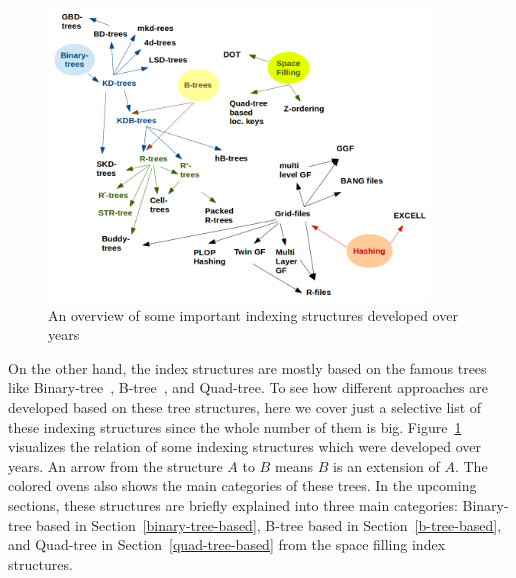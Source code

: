 \documentclass[a4paper,12pt]{article}
\begin{document}
\begin{figure}
\centering
\includegraphics[width=0.9\textwidth]{Trees}
\caption{An overview of some important indexing structures developed over years}
\label{trees}
\end{figure}

On the other hand, the index structures are mostly based on the famous trees like Binary-tree~\cite{binarytree}, B-tree~\cite{btree}, and Quad-tree. 
To see how different approaches are developed based on these tree structures, here we cover just a selective list of these indexing structures since the whole number of them
is big. Figure~\ref{trees} visualizes the relation of some indexing structures which were developed over years. An arrow from the structure $A$ to $B$ means $B$ is an extension of $A$. The colored ovens also shows the main categories of these
trees. In the upcoming sections, these structures are briefly explained into three main categories:
Binary-tree based in Section~\ref{binary-tree-based}, 
B-tree based in Section~\ref{b-tree-based}, 
and Quad-tree in Section~\ref{quad-tree-based} from the space filling index structures.
\end{document}
